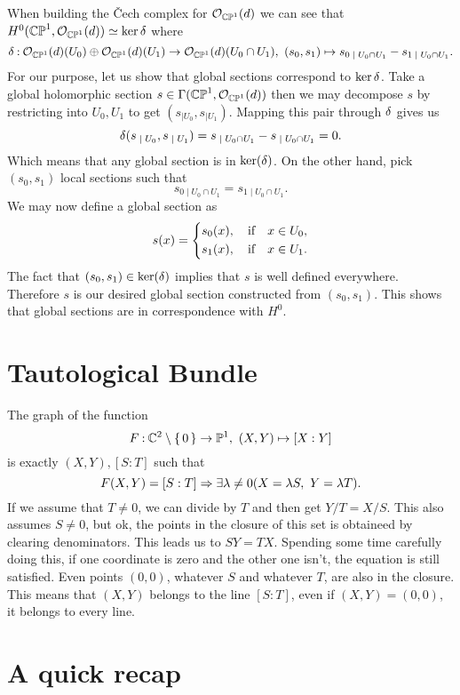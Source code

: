 \documentclass[12pt]{memoir}
\begin{document}
\begin{ptcbr}
    When building the \v{C}ech complex for $\mathcal{O}_{\mathbb{CP}^1}(d)$ we can see that $H^0(\mathbb{CP}^1,\mathcal{O}_{\mathbb{CP}^1}(d))\simeq\ker\delta$ where
    $$\dl\:\cO_{\bCP^1}(d)(U_0)\oplus\cO_{\bCP^1}(d)(U_1)\to\cO_{\bCP^1}(d)(U_0\cap U_1),\ (s_0,s_1)\mapsto s_{0\mid U_0\cap U_1}-s_{1\mid U_0\cap U_1}.$$
    For our purpose, let us show that global sections correspond to $\ker\delta$. Take a global holomorphic section $s\in\Gamma(\mathbb{CP}^1,\mathcal{O}_{\mathbb{CP}^1}(d))$ then we may decompose $s$ by restricting into $U_0,U_1$ to get $(s_{\mid U_0},s_{\mid U_1})$. Mapping this pair through $\delta$ gives us 
    $$\dl(s_{\mid U_0},s_{\mid U_1})=s_{\mid U_0\cap U_1}-s_{\mid U_0\cap U_1}=0.$$
    Which means that any global section is in $\ker(\delta)$. On the other hand, pick $(s_0,s_1)$ local sections such that 
    $$s_{0\mid U_0\cap U_1}=s_{1\mid U_0\cap U_1}.$$
    We may now define a global section as 
    $$s(x)=\left\lbrace
    \begin{aligned}
        &s_0(x),\quad\text{if}\quad x\in U_0,\\
        &s_1(x),\quad\text{if}\quad x\in U_1.
    \end{aligned}
    \right.$$
    The fact that $(s_0,s_1)\in\ker(\delta)$ implies that $s$ is well defined everywhere. Therefore $s$ is our desired global section constructed from $(s_0,s_1)$. This shows that global sections are in correspondence with $H^0$.
\end{ptcbr}

\section{Tautological Bundle}

The graph of the function 
$$F\mathbin{:} \mathbb{C}^2\setminus\{\,0\,\}\to\mathbb{P}^1,\ (X,Y)\mapsto[X:Y]$$
is exactly $(X,Y),[S:T]$ such that 
$$F(X,Y)=[S:T]\Rightarrow\exists\lambda\neq 0(X=\lambda S,\ Y=\lambda T).$$
If we assume that $T\neq 0$, we can divide by $T$ and then get $Y/T=X/S$. This also assumes $S\neq 0$, but ok, the points in the closure of this set is obtaineed by clearing denominators. This leads us to $SY=TX$. Spending some time carefully doing this, if one coordinate is zero and the other one isn't, the equation is still satisfied. Even points $(0,0)$, whatever $S$ and whatever $T$, are also in the closure. This means that $(X,Y)$ belongs to the line $[S:T]$, even if $(X,Y)=(0,0)$, it belongs to every line.


\section{A quick recap}
\end{document}
